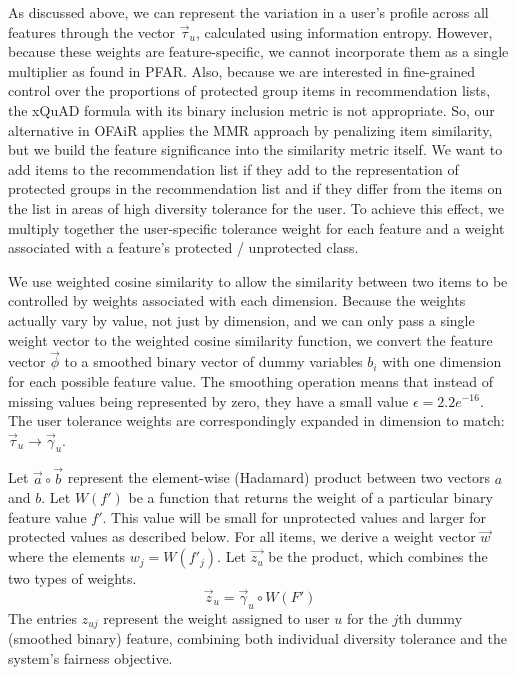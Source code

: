 As discussed above, we can represent the variation in a user's profile across all features through the vector $\vec{\tau}_u$, calculated using information entropy. However, because these weights are feature-specific, we cannot incorporate them as a single multiplier as found in PFAR. Also, because we are interested in fine-grained control over the proportions of protected group items in recommendation lists, the xQuAD formula with its binary inclusion metric is not appropriate. So, our alternative in OFAiR applies the MMR approach by penalizing item similarity, but we build the feature significance into the similarity metric itself. We want to add items to the recommendation list if they add to the representation of protected groups in the recommendation list and if they differ from the items on the list in areas of high diversity tolerance for the user. To achieve this effect, we multiply together the user-specific tolerance weight for each feature and a weight associated with a feature's protected / unprotected class. 

We use weighted cosine similarity to allow the similarity between two items to be controlled by weights associated with each dimension. Because the weights actually vary by value, not just by dimension, and we can only pass a single weight vector to the weighted cosine similarity function, we convert the feature vector $\vec{\phi}$ to a smoothed binary vector of dummy variables $b_i$ with one dimension for each possible feature value. The smoothing operation means that instead of missing values being represented by zero, they have a small value $\epsilon = 2.2e^{-16}$. The user tolerance weights are correspondingly expanded in dimension to match: $\vec{\tau}_u \rightarrow \vec{\gamma}_u$. 

Let $\vec{a} \circ \vec{b}$ represent the element-wise (Hadamard) product between two vectors $a$ and $b$. Let $W(f')$ be a function that returns the weight of a particular binary feature value $f'$. This value will be small for unprotected values and larger for protected values as described below. For all items, we derive a weight vector $\vec{w}$ where the elements $w_j = W(f'_{j})$. Let $\vec{z_{u}}$ be the product, which combines the two types of weights. %
\begin{equation}
\vec{z}_u = \vec{\gamma}_u \circ W(F')
\end{equation}
The entries $z_{uj}$ represent the weight assigned to user $u$ for the $j$th dummy (smoothed binary) feature, combining both individual diversity tolerance and the system's fairness objective.

